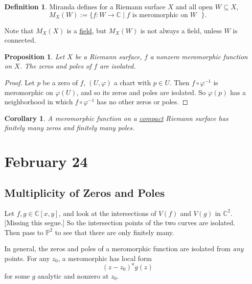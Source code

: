 \documentclass[12pt]{article}
\newcommand{\cx}{\mathbb{C}}
\newcommand{\p}{\mathbb{P}}
\newcommand{\ita}[1]{\textit{#1}}
\newcommand\inv[1]{#1^{-1}}
\newtheorem{corollary}{Corollary}[theorem]
\newtheorem{proposition}[theorem]{Proposition}
\theoremstyle{definition}
\newtheorem{definition}[theorem]{Definition}
\theoremstyle{remark}
\begin{document}
\begin{definition}
    Miranda defines for a Riemann surface $X$ and all open $W\subseteq X$,
    \begin{equation}
        M_X(W):=\{f:W\to\cx\mid f\text{ is meromorphic on $W$ }\}.
    \end{equation}
\end{definition}
Note that $M_X(X)$ is a \underline{field}, but $M_X(W)$ is not always a field, unless $W$ is connected.
\begin{proposition}
    Let $X$ be a Riemann surface, $f$ a nonzero meromorphic function on $X$. The zeros and poles of $f$ are isolated.
\end{proposition}
\begin{proof}
    Let $p$ be a zero of $f$, $(U,\varphi)$ a chart with $p\in U$. Then $f\circ\inv{\varphi}$ is meromorphic on $\varphi(U)$, and so its zeros and poles are isolated. So $\varphi(p)$ has a neighborhood in which $f\circ\inv{\varphi}$ has no other zeros or poles.
\end{proof}
\begin{corollary}
    A meromorphic function on a \underline{compact} Riemann surface has finitely many zeros and finitely many poles.
\end{corollary}
\section{February 24}
\subsection{Multiplicity of Zeros and Poles}
Let $f , g \in \cx[x,y]$, and look at the intersections of $V(f)$ and $V(g)$ in $\cx^2$. [Missing this segue.] So the intersection points of the two curves are isolated. Then pass to $\p^2$ to see that there are only finitely many.

In general, the zeros and poles of a meromorphic function are isolated from \ita{any} points. For any $z_0$, a meromorphic has local form
\begin{equation}
    (z - z_0)^a g(z)
\end{equation}
for some $g$ analytic and nonzero at $z_0$. 
\end{document}
